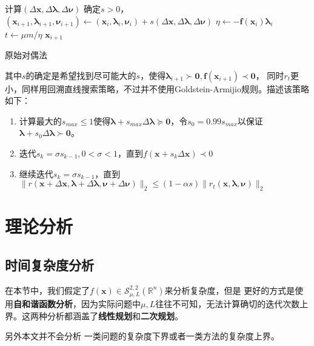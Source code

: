 \documentclass{article}
\begin{document}
\renewcommand{\algorithmcfname}{算法}
\begin{algorithm}[H]
     {
        计算$(\Delta\bm x,\Delta\bm\lambda,\Delta\bm\nu)$\;
        确定$s>0$，$(\bm x_{i+1},\bm\lambda_{i+1},\bm\nu_{i+1})\leftarrow (\bm x_i,\bm\lambda_i,\bm\nu_i)+s(\Delta\bm x,\Delta\bm \lambda,\Delta\bm \nu)$\;
        $\eta\leftarrow-\bm f(\bm x_i)\bm \lambda_i$\;
        $t\leftarrow \mu m/\eta$\;
         {
            \Return $\bm x_{i+1}$
        }

    }
    \caption{原始对偶法}
    \label{prim_dual_method}
\end{algorithm}
其中$s$的确定是希望找到尽可能大的$s$，使得$\bm \lambda_{i+1}\succ \bm 0,\bm f(\bm x_{i+1})\prec\bm 0$，
同时$r_t$更小，同样用回溯直线搜索策略，不过并不使用Goldstein-Armijio规则。描述该策略如下：
\begin{enumerate}
    \item 计算最大的$s_{max}\le 1$使得$\bm\lambda+s_{max}\Delta\bm\lambda\succeq \bm 0$，令$s_0=0.99s_{max}$以保证$\bm\lambda+s_{0}\Delta\bm\lambda\succ \bm 0$。
    \item 迭代$s_k=\sigma s_{k-1},0<\sigma<1$，直到$f(\bm x+s_k\Delta\bm x)\prec 0$
    \item 继续迭代$s_k=\sigma s_{k-1}$，直到$\|r(\bm x+\Delta\bm x,\bm\lambda+\Delta\bm\lambda,\bm\nu+\Delta\bm\nu)\|_2\le(1-\alpha s)\|r_t(\bm x,\bm\lambda,\bm\nu)\|_2$
\end{enumerate}

\section{理论分析}
\subsection{时间复杂度分析}
在本节中，我们假定了$f(\bm x)\in\mathcal{S}_{\mu,L}^{2,2}(\mathbb{R}^n)$来分析复杂度，但是
更好的方式是使用\textbf{自和谐函数分析}，因为实际问题中$\mu,L$往往不可知，无法计算确切的迭代次数上界。这两种分析都涵盖了\textbf{线性规划}和\textbf{二次规划}。

另外本文并不会分析
一类问题的复杂度下界或者一类方法的复杂度上界。
\end{document}
